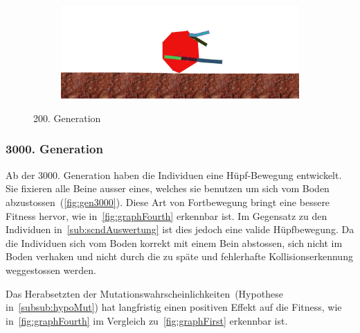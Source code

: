 \begin{figure}[H]
\begin{subfigure}[b]{0.45\textwidth}
            \includegraphics[width=\linewidth,center]{graphics/simulation-results/4_gen200_4}
            \caption{\label{fig:gen200_4}}
          \end{subfigure}
          \caption{200. Generation\label{fig:gen200}}
        \end{figure}

      \subsubsection{3000. Generation\label{subsub:3000gen}}

        Ab der 3000. Generation haben die Individuen eine Hüpf-Bewegung entwickelt.
        Sie fixieren alle Beine ausser eines, welches sie benutzen um sich vom Boden abzustossen~(\vref{fig:gen3000}).
        Diese Art von Fortbewegung bringt eine bessere Fitness hervor, wie in~\vref{fig:graphFourth} erkennbar ist.
        Im Gegensatz zu den Individuen in~\vref{sub:scndAuswertung} ist dies jedoch eine valide Hüpfbewegung.
        Da die Individuen sich vom Boden korrekt mit einem Bein abstossen,
        sich nicht im Boden verhaken und nicht durch die zu späte und fehlerhafte Kollisionserkennung weggestossen werden.

        \medskip

        Das Herabsetzten der Mutationswahrscheinlichkeiten~(Hypothese in~\vref{subsub:hypoMut})
        hat langfristig einen positiven Effekt auf die Fitness,
        wie in~\vref{fig:graphFourth} im Vergleich zu~\vref{fig:graphFirst} erkennbar ist.

        \vspace{0.5cm}

